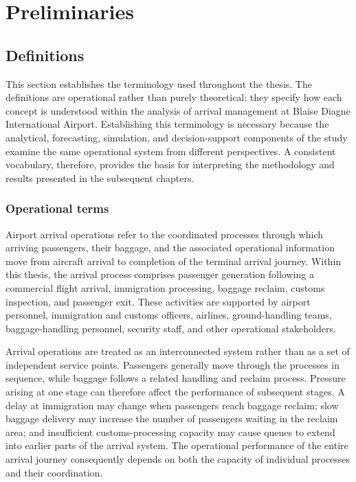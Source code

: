 \chapter{Preliminaries}
\label{chap:preliminaries}

\section{Definitions}
\label{sec:definitions}

This section establishes the terminology used throughout the thesis. The definitions are operational rather than purely theoretical: they specify how each concept is understood within the analysis of arrival management at Blaise Diagne International Airport. Establishing this terminology is necessary because the analytical, forecasting, simulation, and decision-support components of the study examine the same operational system from different perspectives. A consistent vocabulary, therefore, provides the basis for interpreting the methodology and results presented in the subsequent chapters.

\subsection{Operational terms}
\label{subsec:operational-terms}

Airport arrival operations refer to the coordinated processes through which arriving passengers, their baggage, and the associated operational information move from aircraft arrival to completion of the terminal arrival journey. Within this thesis, the arrival process comprises passenger generation following a commercial flight arrival, immigration processing, baggage reclaim, customs inspection, and passenger exit. These activities are supported by airport personnel, immigration and customs officers, airlines, ground-handling teams, baggage-handling personnel, security staff, and other operational stakeholders.

Arrival operations are treated as an interconnected system rather than as a set of independent service points. Passengers generally move through the processes in sequence, while baggage follows a related handling and reclaim process. Pressure arising at one stage can therefore affect the performance of subsequent stages. A delay at immigration may change when passengers reach baggage reclaim; slow baggage delivery may increase the number of passengers waiting in the reclaim area; and insufficient customs-processing capacity may cause queues to extend into earlier parts of the arrival system. The operational performance of the entire arrival journey consequently depends on both the capacity of individual processes and their coordination.

